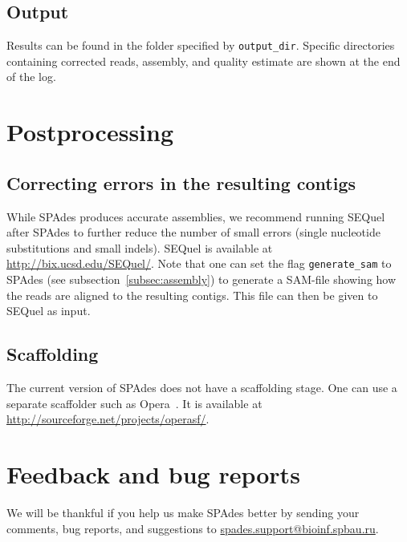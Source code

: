 \documentclass{article}
\def\spades{SPAdes}
\begin{document}
\subsection{Output}
Results can be found in the folder specified by {\tt output\_dir}.
Specific directories containing corrected reads, assembly, and quality estimate are shown at the end of the log.

\section{Postprocessing}

\subsection{Correcting errors in the resulting contigs}
While {\spades} produces accurate assemblies, 
we recommend running SEQuel~\cite{sequel} after {\spades} to further reduce the number of small errors
(single nucleotide substitutions and small indels). SEQuel is available at
\url{http://bix.ucsd.edu/SEQuel/}. Note that one can set the flag {\tt generate\_sam} to {\spades}
(see subsection~\ref{subsec:assembly}) to generate a SAM-file showing how the 
reads are aligned to the resulting contigs. This file can then be given to SEQuel as input.

\subsection{Scaffolding}
The current version of {\spades} does not have a scaffolding stage.
One can use a separate scaffolder such as Opera~\cite{opera}.
It is available at \url{http://sourceforge.net/projects/operasf/}.

\section{Feedback and bug reports}
We will be thankful if you help us make {\spades} better
by sending your comments, bug reports, and suggestions to
\url{spades.support@bioinf.spbau.ru}.




\end{document}
